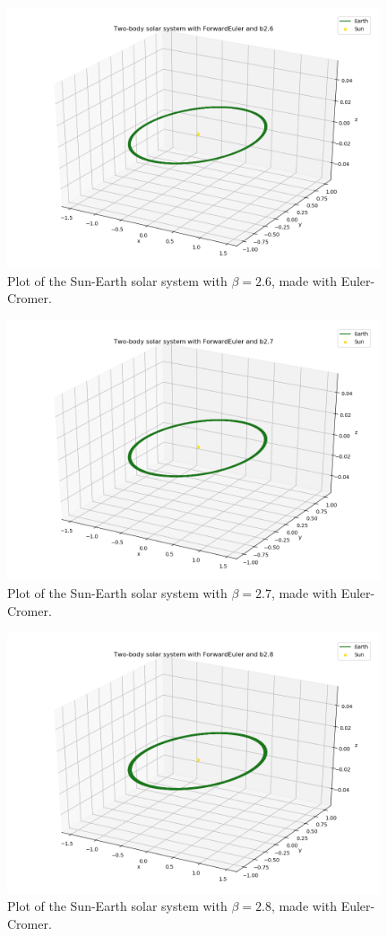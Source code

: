 \documentclass{article}
\begin{document}
    \begin{figure}[H]
        \centering
        \includegraphics[width = 11cm]{img/plot3D_S_E_F_b26.png}
        \caption{Plot of the Sun-Earth solar system with $\beta = 2.6$, made with Euler-Cromer.}
        \label{fig:plot3D_S_E_F_b26}
    \end{figure}

    \begin{figure}[H]
        \centering
        \includegraphics[width = 11cm]{img/plot3D_S_E_F_b27.png}
        \caption{Plot of the Sun-Earth solar system with $\beta = 2.7$, made with Euler-Cromer.}
        \label{fig:plot3D_S_E_F_b27}
    \end{figure}

    \begin{figure}[H]
        \centering
        \includegraphics[width = 11cm]{img/plot3D_S_E_F_b28.png}
        \caption{Plot of the Sun-Earth solar system with $\beta = 2.8$, made with Euler-Cromer.}
        \label{fig:plot3D_S_E_F_b28}
    \end{figure}
\end{document}
